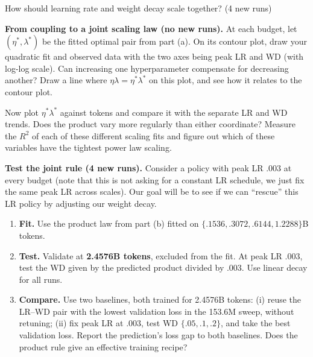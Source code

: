 \begin{problem}{How should learning rate and weight decay scale together? (4 new runs)}
\begin{parts}
\item \textbf{From coupling to a joint scaling law (no new runs).}
At each budget, let $(\eta^*,\lambda^*)$ be the fitted optimal pair from part (a).
On its contour plot, draw your quadratic fit and observed data with the two axes being peak LR and WD (with log-log scale). Can increasing one hyperparameter compensate for decreasing another?
Draw a line where $\eta\lambda=\eta^*\lambda^*$ on this plot, and see how it relates to the contour plot.

Now plot $\eta^*\lambda^*$ against tokens and compare it with the separate
LR and WD trends. Does the product vary more regularly than either coordinate? Measure the $R^{2}$ of each of these different scaling fits and figure out which of these variables have the tightest power law scaling.

\item \textbf{Test the joint rule (4 new runs).}
Consider a policy with peak LR $.003$ at every budget (note that this is not asking for a constant LR schedule, we just fix the same peak LR across scales). Our goal will be to see if we can ``rescue'' this LR policy by adjusting our weight decay.

\begin{enumerate}[label=\arabic*., nosep, leftmargin=*]
\item \textbf{Fit.} Use the product law from part (b) fitted on
$\{.1536,.3072,.6144,1.2288\}$B tokens.
\item \textbf{Test.} Validate at \textbf{2.4576B tokens}, excluded from the fit.
At peak LR $.003$, test the WD given by the predicted product divided by $.003$.
Use linear decay for all runs.
\item \textbf{Compare.} Use two baselines, both trained for 2.4576B tokens:
(i) reuse the LR--WD pair with the lowest validation loss in the 153.6M sweep,
without retuning; (ii) fix peak LR at $.003$, test WD $\{.05,.1,.2\}$,
and take the best validation loss.
Report the prediction's loss gap to both baselines.
Does the product rule give an effective training recipe?
\end{enumerate}
\end{parts}
\end{problem}

